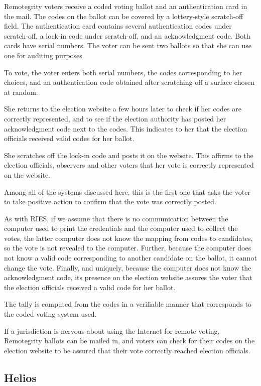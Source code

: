 Remotegrity voters receive a coded voting ballot and an authentication
card in the mail. The codes on the ballot can be covered by a
lottery-style scratch-off field. The authentication card contains
several authentication codes under scratch-off, a lock-in code under
scratch-off, and an acknowledgment code. Both cards have serial
numbers. The voter can be sent two ballots so that she can use one for
auditing purposes.

To vote, the voter enters both serial numbers, the codes corresponding
to her choices, and an authentication code obtained after
scratching-off a surface chosen at random.

She returns to the election website a few hours later to check if her
codes are correctly represented, and to see if the election authority
has posted her acknowledgment code next to the codes. This indicates
to her that the election officials received valid codes for her
ballot.

She scratches off the lock-in code and posts it on the website. This
affirms to the election officials, observers and other voters that her
vote is correctly represented on the website.

Among all of the systems discussed here, this is the first one that
asks the voter to take positive action to confirm that the vote was
correctly posted.

As with RIES, if we assume that there is no communication between the
computer used to print the credentials and the computer used to
collect the votes, the latter computer does not know the mapping
from codes to candidates, so the vote is not revealed to the
computer. Further, because the computer does not know a valid code
corresponding to another candidate on the ballot, it cannot change the
vote. Finally, and uniquely, because the computer does not know the
acknowledgment code, its presence on the election website assures the
voter that the election officials received a valid code for her
ballot.

The tally is computed from the codes in a verifiable manner that
corresponds to the coded voting system used.

If a jurisdiction is nervous about using the Internet for remote
voting, Remotegrity ballots can be mailed in, and voters can check for
their codes on the election website to be assured that their vote
correctly reached election officials.

\subsection{Helios~\cite{adida2008,adida2009}}

